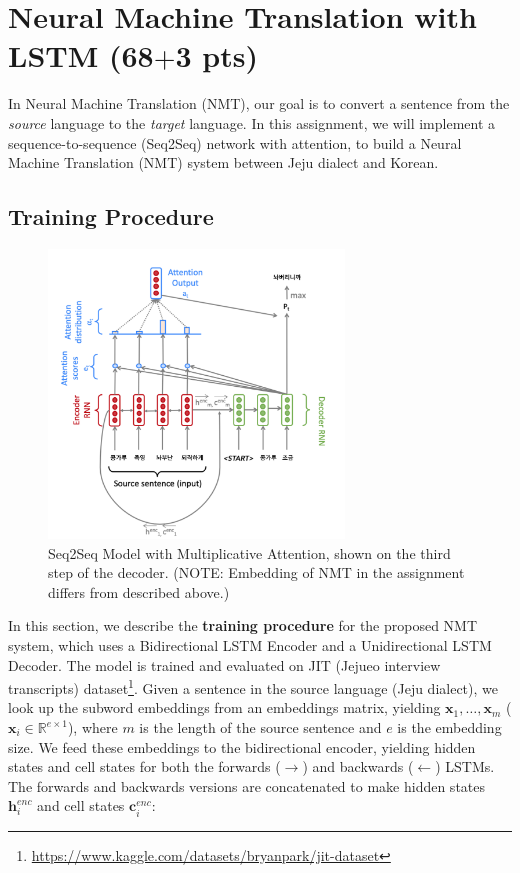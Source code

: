 \documentclass{assignment format}
\begin{document}
\section{Neural Machine Translation with LSTM (68$+$3 pts)}
 In Neural Machine Translation (NMT), our goal is to convert a sentence from the \textit{source} language to the \textit{target} language. In this assignment, we will implement a sequence-to-sequence (Seq2Seq) network with attention, to build a Neural Machine Translation (NMT) system between Jeju dialect and Korean. 
 \subsection{Training Procedure}
\begin{figure}[h]
    \begin{center}
        \captionsetup{width=0.8\textwidth}
        \includegraphics[width=0.7\textwidth]{nmt.png}
        \caption{Seq2Seq Model with Multiplicative Attention, shown on the third step of the decoder.  (NOTE: Embedding of NMT in the assignment differs from described above.)
        }
        \label{nmt-figure}
    \end{center}
\end{figure}
In this section, we describe the \textbf{training procedure} for the proposed NMT system, which uses a Bidirectional LSTM Encoder and a Unidirectional LSTM Decoder. The model is trained and evaluated on JIT (Jejueo interview transcripts) dataset\footnote{\url{https://www.kaggle.com/datasets/bryanpark/jit-dataset}}. Given a sentence in the source language (Jeju dialect), we look up the subword embeddings from an embeddings matrix, yielding $\mathbf{x}_1, \dots, \mathbf{x}_m$ ($\mathbf{x}_i \in \mathbb{R}^{e \times 1}$), where $m$ is the length of the source sentence and $e$ is the embedding size. We feed these embeddings to the bidirectional encoder, yielding hidden states and cell states for both the forwards ($\rightarrow$) and backwards ($\leftarrow$) LSTMs. The forwards and backwards versions are concatenated to make hidden states $\mathbf{h}^{enc}_i$ and cell states $\mathbf{c}^{enc}_i$:
\end{document}
